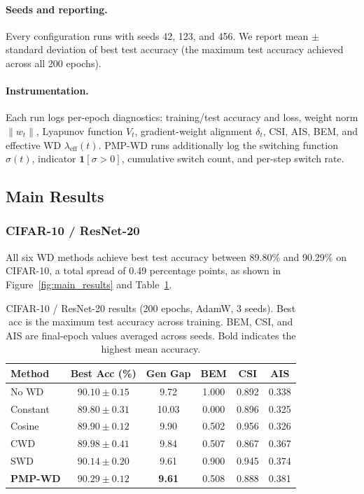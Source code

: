 \documentclass{article}
\begin{document}
\paragraph{Seeds and reporting.} Every configuration runs with seeds 42, 123, and 456. We report mean $\pm$ standard deviation of best test accuracy (the maximum test accuracy achieved across all 200 epochs).

\paragraph{Instrumentation.} Each run logs per-epoch diagnostics: training/test accuracy and loss, weight norm $\|w_t\|$, Lyapunov function $V_t$, gradient-weight alignment $\delta_t$, CSI, AIS, BEM, and effective WD $\lambda_{\text{eff}}(t)$. PMP-WD runs additionally log the switching function $\sigma(t)$, indicator $\mathbf{1}[\sigma > 0]$, cumulative switch count, and per-step switch rate.

\subsection{Main Results}

\subsubsection{CIFAR-10 / ResNet-20}

All six WD methods achieve best test accuracy between 89.80\% and 90.29\% on CIFAR-10, a total spread of 0.49 percentage points, as shown in Figure~\ref{fig:main_results} and Table~\ref{tab:main_results}.

\begin{table}[t]
  \caption{CIFAR-10 / ResNet-20 results (200 epochs, AdamW, 3 seeds). Best acc is the maximum test accuracy across training. BEM, CSI, and AIS are final-epoch values averaged across seeds. Bold indicates the highest mean accuracy.}
  \label{tab:main_results}
  \centering
  \small
  \begin{tabular}{lccccc}
    \toprule
    Method & Best Acc (\%) & Gen Gap & BEM & CSI & AIS \\
    \midrule
    No WD & $90.10 \pm 0.15$ & 9.72 & 1.000 & 0.892 & 0.338 \\
    Constant & $89.80 \pm 0.31$ & 10.03 & 0.000 & 0.896 & 0.325 \\
    Cosine & $89.90 \pm 0.12$ & 9.90 & 0.502 & 0.956 & 0.326 \\
    CWD & $89.98 \pm 0.41$ & 9.84 & 0.507 & 0.867 & 0.367 \\
    SWD & $90.14 \pm 0.20$ & 9.61 & 0.900 & 0.945 & 0.374 \\
    \textbf{PMP-WD} & $\mathbf{90.29 \pm 0.12}$ & \textbf{9.61} & 0.508 & 0.888 & 0.381 \\
    \bottomrule
  \end{tabular}
\end{table}
\end{document}
